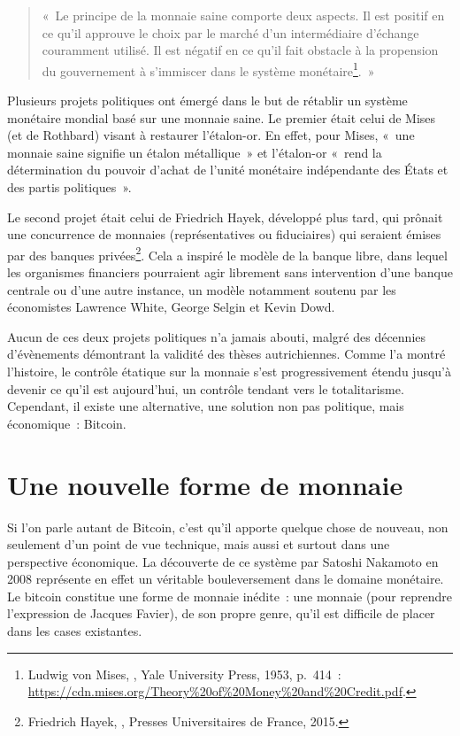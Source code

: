 \begin{quote}
«~Le principe de la monnaie saine comporte deux aspects. Il est positif en ce qu'il approuve le choix par le marché d'un intermédiaire d'échange couramment utilisé. Il est négatif en ce qu'il fait obstacle à la propension du gouvernement à s'immiscer dans le système monétaire\footnote{Ludwig von Mises, , Yale University Press, 1953, p.~414~: \url{https://cdn.mises.org/Theory\%20of\%20Money\%20and\%20Credit.pdf}.}.~»
\end{quote} %

\clearpage
Plusieurs projets politiques ont émergé dans le but de rétablir un système monétaire mondial basé sur une monnaie saine. Le premier était celui de Mises (et de Rothbard) visant à restaurer l'étalon-or. En effet, pour Mises, «~une monnaie saine signifie un étalon métallique~» et l'étalon-or «~rend la détermination du pouvoir d'achat de l'unité monétaire indépendante des États et des partis politiques~».

Le second projet était celui de Friedrich Hayek, développé plus tard, qui prônait une concurrence de monnaies (représentatives ou fiduciaires) qui seraient émises par des banques privées\footnote{Friedrich Hayek, , Presses Universitaires de France, 2015.}. Cela a inspiré le modèle de la banque libre, dans lequel les organismes financiers pourraient agir librement sans intervention d'une banque centrale ou d'une autre instance, un modèle notamment soutenu par les économistes Lawrence White, George Selgin et Kevin Dowd.

Aucun de ces deux projets politiques n'a jamais abouti, malgré des décennies d'évènements démontrant la validité des thèses autrichiennes. Comme l'a montré l'histoire, le contrôle étatique sur la monnaie s'est progressivement étendu jusqu'à devenir ce qu'il est aujourd'hui, un contrôle tendant vers le totalitarisme. Cependant, il existe une alternative, une solution non pas politique, mais économique~: Bitcoin.

\section*{Une nouvelle forme de monnaie}

Si l'on parle autant de Bitcoin, c'est qu'il apporte quelque chose de nouveau, non seulement d'un point de vue technique, mais aussi et surtout dans une perspective économique. La découverte de ce système par Satoshi Nakamoto en 2008 représente en effet un véritable bouleversement dans le domaine monétaire. Le bitcoin constitue une forme de monnaie inédite~: une monnaie  (pour reprendre l'expression de Jacques Favier), de son propre genre, qu'il est difficile de placer dans les cases existantes.

